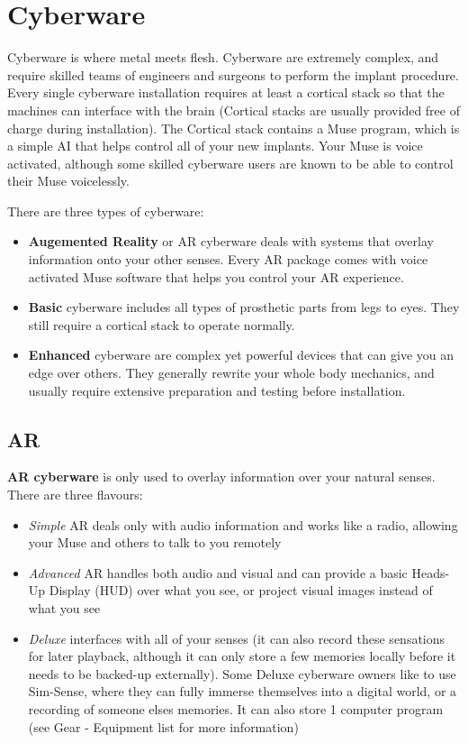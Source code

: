 
\section{Cyberware}
\label{sec:cyberware}

\begin{multicols}{2}

Cyberware is where metal meets flesh. Cyberware are extremely complex, and require skilled teams of engineers and surgeons to perform the implant procedure. Every single cyberware installation requires at least a cortical stack so that the machines can interface with the brain (Cortical stacks are usually provided free of charge during installation). The Cortical stack contains a Muse program, which is a simple AI that helps control all of your new implants. Your Muse is voice activated, although some skilled cyberware users are known to be able to control their Muse voicelessly.

There are three types of cyberware:

\begin{itemize}
  \item \textbf{Augemented Reality} or AR cyberware deals with systems that overlay information onto your other senses. Every AR package comes with voice activated Muse software that helps you control your AR experience.
  \item \textbf{Basic} cyberware includes all types of prosthetic parts from legs to eyes. They still require a cortical stack to operate normally.
  \item \textbf{Enhanced} cyberware are complex yet powerful devices that can give you an edge over others. They generally rewrite your whole body mechanics, and usually require extensive preparation and testing before installation.
\end{itemize}

\subsection{AR}

\textbf{AR cyberware} is only used to overlay information over your natural senses. There are three flavours: 
\begin{itemize}
  \item \textit{Simple} AR deals only with audio information and works like a radio, allowing your Muse and others to talk to you remotely
  \item \textit{Advanced} AR handles both audio and visual and can provide a basic Heads-Up Display (HUD) over what you see, or project visual images instead of what you see
  \item \textit{Deluxe} interfaces with all of your senses (it can also record these sensations for later playback, although it can only store a few memories locally before it needs to be backed-up externally). Some Deluxe cyberware owners like to use Sim-Sense, where they can fully immerse themselves into a digital world, or a recording of someone elses memories. It can also store 1 computer program (see Gear - Equipment list for more information)
\end{itemize}


\end{multicols}
